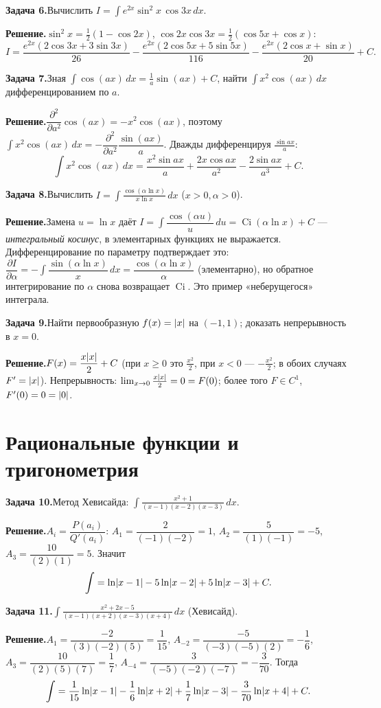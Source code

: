 \documentclass[10pt,a4paper]{article}
\newcommand{\dx}{\,dx}
\renewcommand{\ge}{\geqslant}
\DeclarePairedDelimiter{\abs}{\lvert}{\rvert}
\theoremstyle{definition}
\theoremstyle{plain}
\newcommand{\writespace}{\vspace{7.5mm}}
\newcommand{\task}[2]{%
  \par\writespace\noindent
  \textbf{\textcolor{accent}{Задача #1.}}\enspace #2\par\smallskip}
\newcommand{\sol}{\par\noindent\textbf{Решение.}\enspace}
\begin{document}
\task{6}{Вычислить $\displaystyle I=\int e^{2x}\sin^2x\,\cos3x\dx$.}
\sol $\sin^2x=\tfrac12(1-\cos2x)$, $\cos2x\cos3x=\tfrac12(\cos5x+\cos x)$:
\[
  I=\frac{e^{2x}(2\cos3x+3\sin3x)}{26}-\frac{e^{2x}(2\cos5x+5\sin5x)}{116}
   -\frac{e^{2x}(2\cos x+\sin x)}{20}+C.
\]

\task{7}{Зная $\int\cos(ax)\dx=\tfrac1a\sin(ax)+C$, найти $\displaystyle\int x^2\cos(ax)\dx$ дифференцированием по $a$.}
\sol $\dfrac{\partial^2}{\partial a^2}\cos(ax)=-x^2\cos(ax)$, поэтому
$\int x^2\cos(ax)\dx=-\dfrac{\partial^2}{\partial a^2}\dfrac{\sin(ax)}{a}$. Дважды дифференцируя
$\tfrac{\sin ax}{a}$:
\[
  \int x^2\cos(ax)\dx=\frac{x^2\sin ax}{a}+\frac{2x\cos ax}{a^2}-\frac{2\sin ax}{a^3}+C.
\]

\task{8}{Вычислить $\displaystyle I=\int\frac{\cos(\alpha\ln x)}{x\ln x}\dx$ ($x>0,\alpha>0$).}
\sol Замена $u=\ln x$ даёт $I=\int\dfrac{\cos(\alpha u)}{u}\,du=\operatorname{Ci}(\alpha\ln x)+C$ —
\emph{интегральный косинус}, в элементарных функциях не выражается. Дифференцирование по параметру
подтверждает это: $\dfrac{\partial I}{\partial\alpha}=-\int\dfrac{\sin(\alpha\ln x)}{x}\dx
=\dfrac{\cos(\alpha\ln x)}{\alpha}$ (элементарно), но обратное интегрирование по $\alpha$ снова
возвращает $\operatorname{Ci}$. Это пример «неберущегося» интеграла.

\task{9}{Найти первообразную $f(x)=\abs x$ на $(-1,1)$; доказать непрерывность в $x=0$.}
\sol $F(x)=\dfrac{x\abs x}{2}+C$ (при $x\ge0$ это $\tfrac{x^2}2$, при $x<0$ — $-\tfrac{x^2}2$;
в обоих случаях $F'=\abs x$). Непрерывность: $\lim_{x\to0}\tfrac{x\abs x}{2}=0=F(0)$; более того
$F\in C^1$, $F'(0)=0=\abs0$.

\section{Рациональные функции и тригонометрия}

\task{10}{Метод Хевисайда: $\displaystyle\int\frac{x^2+1}{(x-1)(x-2)(x-3)}\dx$.}
\sol $A_i=\dfrac{P(a_i)}{Q'(a_i)}$: $A_1=\dfrac{2}{(-1)(-2)}=1$, $A_2=\dfrac{5}{(1)(-1)}=-5$,
$A_3=\dfrac{10}{(2)(1)}=5$. Значит
\[
  \int=\ln\abs{x-1}-5\ln\abs{x-2}+5\ln\abs{x-3}+C.
\]

\task{11}{$\displaystyle\int\frac{x^2+2x-5}{(x-1)(x+2)(x-3)(x+4)}\dx$ (Хевисайд).}
\sol $A_1=\dfrac{-2}{(3)(-2)(5)}=\dfrac1{15}$, $A_{-2}=\dfrac{-5}{(-3)(-5)(2)}=-\dfrac16$,
$A_3=\dfrac{10}{(2)(5)(7)}=\dfrac17$, $A_{-4}=\dfrac{3}{(-5)(-2)(-7)}=-\dfrac3{70}$. Тогда
\[
  \int=\frac1{15}\ln\abs{x-1}-\frac16\ln\abs{x+2}+\frac17\ln\abs{x-3}-\frac3{70}\ln\abs{x+4}+C.
\]
\end{document}
